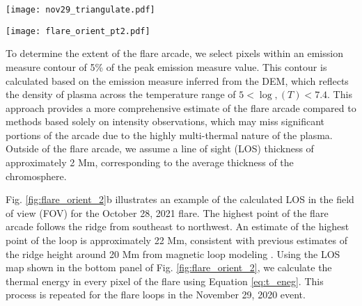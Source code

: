 \begin{figure*}[ht!]
    \centering
    \texttt{[image: nov29\_triangulate.pdf]}
    \caption{Panel (a): SDO/AIA 193 {\AA} observation of the Nov 29 flare in the decay phase. The blue cross marks a point on the top of the arcade. The LOS goes into the page from AIA perspective. Panel (b): {\it STEREO-A}/EUVI 195 {\AA} observation around same time. The blue solid line is the LOS from AIA perspective in panel (a) projected onto {\it STEREO-A} perspective. We can trace out the height of the flare arcade at various locations using \textit{scc\_measure.pro}. The height of the arcade at various points from the Sun's surface is marked in panel (a).}
    \label{fig:flare_orient2}
    \end{figure*}

\begin{figure*}[ht!]
    \centering
    \texttt{[image: flare\_orient\_pt2.pdf]}
    \caption{Panel (a): Cartoon demonstrating the projection effects of a semicircular loop between STEREO-A and AIA vantages due to the difference between polar ($\theta$) and azimuthal ($\phi$) angles, respectively. Panel (b) : The calculated LOS map from the AIA perspective, with the estimated loop top height under the assumption of a semi-circular loop geometry.}
    \label{fig:flare_orient_2}
\end{figure*}

To determine the extent of the flare arcade, we select pixels within an emission measure contour of 5\% of the peak emission measure value. This contour is calculated based on the emission measure inferred from the DEM, which reflects the density of plasma across the temperature range of $5<\log,(T)<7.4$. This approach provides a more comprehensive estimate of the flare arcade compared to methods based solely on intensity observations, which may miss significant portions of the arcade due to the highly multi-thermal nature of the plasma. Outside of the flare arcade, we assume a line of sight (LOS) thickness of approximately 2 Mm, corresponding to the average thickness of the chromosphere.

Fig. \ref{fig:flare_orient_2}b illustrates an example of the calculated LOS in the field of view (FOV) for the October 28, 2021 flare. The highest point of the flare arcade follows the ridge from southeast to northwest. An estimate of the highest point of the loop is approximately 22 Mm, consistent with previous estimates of the ridge height around 20 Mm from magnetic loop modeling \citep{longcope22}. Using the LOS map shown in the bottom panel of Fig. \ref{fig:flare_orient_2}, we calculate the thermal energy in every pixel of the flare using Equation \ref{eq:t_eneg}. This process is repeated for the flare loops in the November 29, 2020 event.

